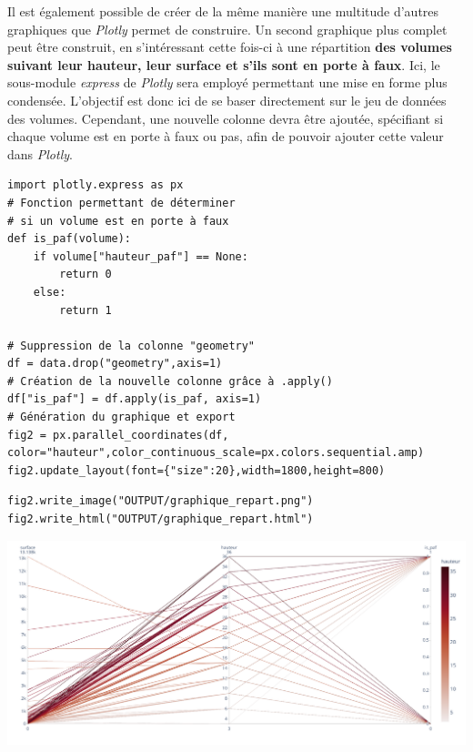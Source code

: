 \documentclass[
  11pt,
  french,
]{article}
\newcounter{customfigs}[section]
\newenvironment{customfigs}[1][] {
    \stepcounter{customfigs}
    Fig \arabic{section}. \arabic{customfigs} : }
\newcommand{\masked}{\vspace*{-\baselineskip}}
\begin{document}
Il est également possible de créer de la même manière une multitude
d'autres graphiques que \emph{Plotly} permet de construire. Un second
graphique plus complet peut être construit, en s'intéressant cette
fois-ci à une répartition \textbf{des volumes suivant leur hauteur, leur
surface et s'ils sont en porte à faux}. Ici, le sous-module
\emph{express} de \emph{Plotly} sera employé permettant une mise en
forme plus condensée. L'objectif est donc ici de se baser directement
sur le jeu de données des volumes. Cependant, une nouvelle colonne devra
être ajoutée, spécifiant si chaque volume est en porte à faux ou pas,
afin de pouvoir ajouter cette valeur dans \emph{Plotly}.

\begin{tcolorbox}[title= Création d'un second graphique de répartition des volumes ,colback=boitecode]
\begin{lstlisting}[style=code]
import plotly.express as px
# Fonction permettant de déterminer
# si un volume est en porte à faux
def is_paf(volume):
    if volume["hauteur_paf"] == None:
        return 0
    else:
        return 1

# Suppression de la colonne "geometry"
df = data.drop("geometry",axis=1)
# Création de la nouvelle colonne grâce à .apply()
df["is_paf"] = df.apply(is_paf, axis=1)
# Génération du graphique et export
fig2 = px.parallel_coordinates(df, color="hauteur",color_continuous_scale=px.colors.sequential.amp)
fig2.update_layout(font={"size":20},width=1800,height=800)\end{lstlisting}
\begin{lstlisting}[style=code]
fig2.write_image("OUTPUT/graphique_repart.png")
fig2.write_html("OUTPUT/graphique_repart.html")\end{lstlisting}
\end{tcolorbox}

\begin{tcolorbox}[title=\begin{customfigs} Répartition des volumes selon leurs caractéristiques \end{customfigs}]

\begin{center}\includegraphics[width=1\linewidth]{OUTPUT/graphique_repart} \end{center}

\end{tcolorbox}
\end{document}
